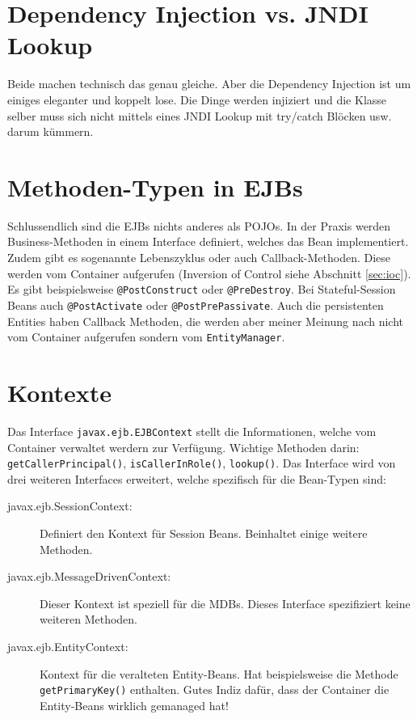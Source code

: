\section{Dependency Injection vs. JNDI Lookup}
Beide machen technisch das genau gleiche. Aber die Dependency Injection ist um einiges eleganter und koppelt lose. Die Dinge werden injiziert und die Klasse selber muss sich nicht mittels eines JNDI Lookup mit try/catch Blöcken usw. darum kümmern.

\section{Methoden-Typen in EJBs}

Schlussendlich sind die EJBs nichts anderes als POJOs. In der Praxis werden Business-Methoden in einem Interface definiert, welches das Bean implementiert. Zudem gibt es sogenannte Lebenszyklus oder auch Callback-Methoden. Diese werden vom Container aufgerufen (Inversion of Control siehe Abschnitt \ref{sec:ioc}). Es gibt beispielsweise \verb|@PostConstruct| oder \verb|@PreDestroy|. Bei Stateful-Session Beans auch \verb|@PostActivate| oder \verb|@PostPrePassivate|. Auch die persistenten Entities haben Callback Methoden, die werden aber meiner Meinung nach nicht vom Container aufgerufen sondern vom \verb|EntityManager|.

\section{Kontexte}
Das Interface \verb|javax.ejb.EJBContext| stellt die Informationen, welche vom Container verwaltet werdern zur Verfügung. Wichtige Methoden darin: \verb|getCallerPrincipal()|, \verb|isCallerInRole()|, \verb|lookup()|. Das Interface wird von drei weiteren Interfaces erweitert, welche spezifisch für die Bean-Typen sind:
\begin{description}
	\item[javax.ejb.SessionContext:] Definiert den Kontext für Session Beans. Beinhaltet einige weitere Methoden.
	
	\item[javax.ejb.MessageDrivenContext:] Dieser Kontext ist speziell für die MDBs. Dieses Interface spezifiziert keine weiteren Methoden.
	
	\item[javax.ejb.EntityContext:] Kontext für die veralteten Entity-Beans. Hat beispielsweise die Methode \verb|getPrimaryKey()| enthalten. Gutes Indiz dafür, dass der Container die Entity-Beans wirklich gemanaged hat!
\end{description}

